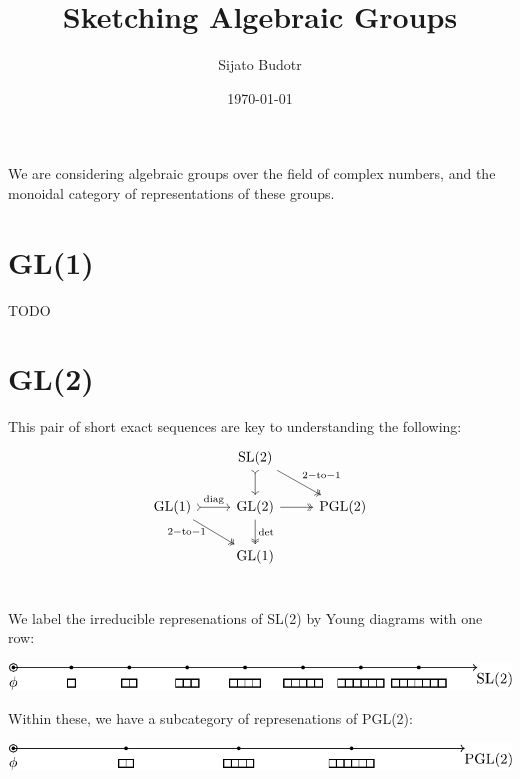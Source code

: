 \documentclass[11pt,oneside]{article}
\title{Sketching Algebraic Groups}
\author{Sijato Budotr}
\date{\today}
\newcommand{\GL}{\mathrm{GL}}
\newcommand{\SL}{\mathrm{SL}}
\newcommand{\PGL}{\mathrm{PGL}}
\begin{document}
\maketitle




We are considering algebraic groups over the field of
complex numbers, and the monoidal category of representations of 
these groups.

\section*{GL(1)}

TODO

\section*{GL(2)}

This pair of short exact sequences are key
to understanding the following:
\[
\begin{tikzcd}
    &  
    \SL(2) \arrow[rightarrowtail]{d}\arrow[two heads]{dr}{\mathrm{2-to-1}} &  \\
    \GL(1) \arrow[rightarrowtail]{r}{\mathrm{diag}} 
           \arrow[two heads]{dr}[below,left]{\mathrm{2-to-1\ }}  &  
    \GL(2) \arrow[two heads]{r}\arrow[two heads]{d}{\mathrm{det}}  &  \PGL(2)     \\
    &  \GL(1)             &     \\
\end{tikzcd}
\]


We label the irreducible represenations of SL(2) by
Young diagrams with one row:
\begin{center}
\includegraphics[]{images/sl2.pdf}
\end{center}

Within these, we have a subcategory of represenations of PGL(2):
\begin{center}
\includegraphics[]{images/pgl2.pdf}
\end{center}
\end{document}
